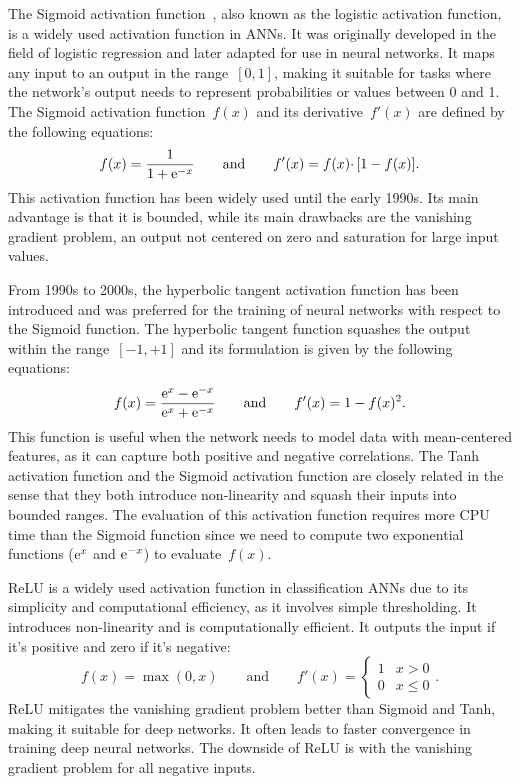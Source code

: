 \documentclass[algorithms,article,submit,pdftex,oneauthors]{Definitions/mdpi}
\DeclareRobustCommand{\e}[1]{{\rm e}^{#1}}
\begin{document}
The Sigmoid activation function~\cite{Han-1995-ISF}, also known as the logistic activation function, is a widely used activation function in ANNs.
It was originally developed in the field of logistic regression and later adapted for use in neural networks.
It maps any input to an output in the range~$[0,1]$, making it suitable for tasks where the network's output needs to represent probabilities or values between 0 and 1.
The Sigmoid activation function~$f(x)$ and its derivative~$f'(x)$ are defined by the following equations:
\begin{equation}
f(x) = \frac{1}{1+\e{-x}}\qquad \text{and}\qquad f'(x) = f(x)\cdotp\left[1-f(x)\right].\label{eq:act-sig}
\end{equation}
This activation function has been widely used until the early 1990s.
Its main advantage is that it is bounded, while its main drawbacks are the vanishing gradient problem, an output not centered on zero and saturation for large input values.

From 1990s to 2000s, the hyperbolic tangent activation function has been introduced and was preferred for the training of neural networks with respect to the Sigmoid function.
The hyperbolic tangent function squashes the output within the range~$[-1,+1]$ and its formulation is given by the following equations:
\begin{equation}
f(x) = \frac{\e{x} - \e{-x}}{\e{x} + \e{-x}}\qquad \text{and}\qquad f'(x) = 1 - f(x)^2.\label{eq:act-tanh}
\end{equation}
This function is useful when the network needs to model data with mean-centered features, as it can capture both positive and negative correlations.
The Tanh activation function and the Sigmoid activation function are closely related in the sense that they both introduce non-linearity and squash their inputs into bounded ranges.
The evaluation of this activation function requires more CPU time than the Sigmoid function since we need to compute two exponential functions ($\e{x}$ and $\e{-x}$) to evaluate~$f(x)$.

ReLU is a widely used activation function in classification ANNs due to its simplicity and computational efficiency, as it involves simple thresholding.
It introduces non-linearity and is computationally efficient.
It outputs the input if it's positive and zero if it's negative:
\begin{equation}
f(x) = \max(0,x)\qquad \text{and}\qquad f'(x) =
\begin{cases}
1&x>0\\
0&x\le 0
\end{cases}.\label{eq:act-relu}
\end{equation}
ReLU mitigates the vanishing gradient problem better than Sigmoid and Tanh, making it suitable for deep networks.
It often leads to faster convergence in training deep neural networks.
The downside of ReLU is with the vanishing gradient problem for all negative inputs.
\end{document}
